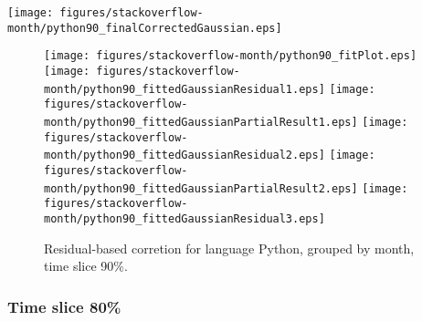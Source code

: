 \begin{center}
{\texttt{[image: figures/stackoverflow-month/python90\_finalCorrectedGaussian.eps]}}
\end{center}

\FloatBarrier

\begin{figure}[t]
\centering
{}
{\texttt{[image: figures/stackoverflow-month/python90\_fitPlot.eps]}}
{\texttt{[image: figures/stackoverflow-month/python90\_fittedGaussianResidual1.eps]}}
{\texttt{[image: figures/stackoverflow-month/python90\_fittedGaussianPartialResult1.eps]}}
{\texttt{[image: figures/stackoverflow-month/python90\_fittedGaussianResidual2.eps]}}
{\texttt{[image: figures/stackoverflow-month/python90\_fittedGaussianPartialResult2.eps]}}
{\texttt{[image: figures/stackoverflow-month/python90\_fittedGaussianResidual3.eps]}}
\caption{Residual-based corretion for language Python, grouped by month, time slice 90\%.}
\end{figure}


\FloatBarrier


\subsubsection{Time slice 80\%}

